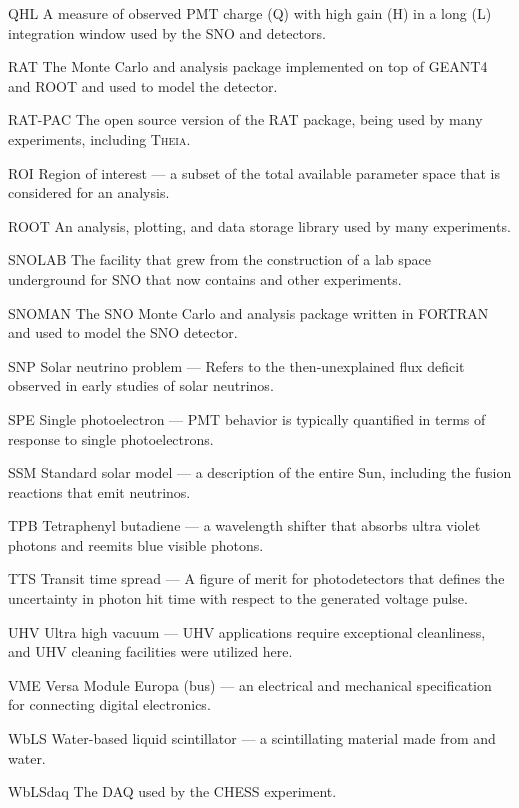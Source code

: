 \begin{labeling}{{\labppo}}
\item[QHL] A measure of observed PMT charge (Q) with high gain (H) in a long (L) integration window used by the SNO and {\snop} detectors.
\item[RAT] The {\snop} Monte Carlo and analysis package implemented on top of GEANT4 and ROOT and used to model the {\snop} detector.
\item[RAT-PAC] The open source version of the RAT package, being used by many experiments, including \textsc{Theia}.
\item[ROI] Region of interest --- a subset of the total available parameter space that is considered for an analysis.
\item[ROOT] An analysis, plotting, and data storage library used by many experiments.
\item[SNOLAB] The facility that grew from the construction of a lab space underground for SNO that now contains {\snop} and other experiments.
\item[SNOMAN] The SNO Monte Carlo and analysis package written in FORTRAN and used to model the SNO detector.
\item[SNP] Solar neutrino problem --- Refers to the then-unexplained flux deficit observed in early studies of solar neutrinos.
\item[SPE] Single photoelectron --- PMT behavior is typically quantified in terms of response to single photoelectrons.
\item[SSM] Standard solar model --- a description of the entire Sun, including the fusion reactions that emit neutrinos.
\item[TPB] Tetraphenyl butadiene --- a wavelength shifter that absorbs ultra violet photons and reemits blue visible photons.
\item[TTS] Transit time spread --- A figure of merit for photodetectors that defines the uncertainty in photon hit time with respect to the generated voltage pulse.
\item[UHV] Ultra high vacuum --- UHV applications require exceptional cleanliness, and UHV cleaning facilities were utilized here.
\item[VME] Versa Module Europa (bus) --- an electrical and mechanical specification for connecting digital electronics.
\item[WbLS] Water-based liquid scintillator --- a scintillating material made from {\labppo} and water.
\item[WbLSdaq] The DAQ used by the CHESS experiment.
\end{labeling}
